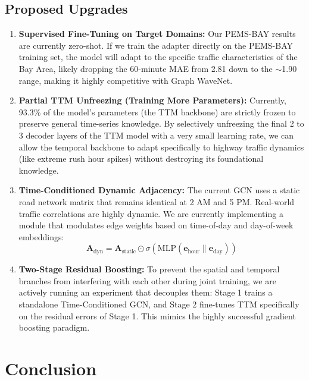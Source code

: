 \documentclass[11pt, a4paper]{article}
\begin{document}
\subsection{Proposed Upgrades}

\begin{enumerate}
    \item \textbf{Supervised Fine-Tuning on Target Domains:} Our PEMS-BAY results are currently zero-shot. If we train the adapter directly on the PEMS-BAY training set, the model will adapt to the specific traffic characteristics of the Bay Area, likely dropping the 60-minute MAE from 2.81 down to the $\sim$1.90 range, making it highly competitive with Graph WaveNet.
    
    \item \textbf{Partial TTM Unfreezing (Training More Parameters):} Currently, 93.3\% of the model's parameters (the TTM backbone) are strictly frozen to preserve general time-series knowledge. By selectively unfreezing the final 2 to 3 decoder layers of the TTM model with a very small learning rate, we can allow the temporal backbone to adapt specifically to highway traffic dynamics (like extreme rush hour spikes) without destroying its foundational knowledge.
    
    \item \textbf{Time-Conditioned Dynamic Adjacency:} The current GCN uses a static road network matrix that remains identical at 2 AM and 5 PM. Real-world traffic correlations are highly dynamic. We are currently implementing a module that modulates edge weights based on time-of-day and day-of-week embeddings:
    \begin{equation}
        \mathbf{A}_{\text{dyn}} = \mathbf{A}_{\text{static}} \odot \sigma(\text{MLP}(\mathbf{e}_{\text{hour}} \| \mathbf{e}_{\text{day}}))
    \end{equation}
    
    \item \textbf{Two-Stage Residual Boosting:} To prevent the spatial and temporal branches from interfering with each other during joint training, we are actively running an experiment that decouples them: Stage 1 trains a standalone Time-Conditioned GCN, and Stage 2 fine-tunes TTM specifically on the residual errors of Stage 1. This mimics the highly successful gradient boosting paradigm.
\end{enumerate}

\section{Conclusion}
\label{sec:conclusion}
\end{document}
